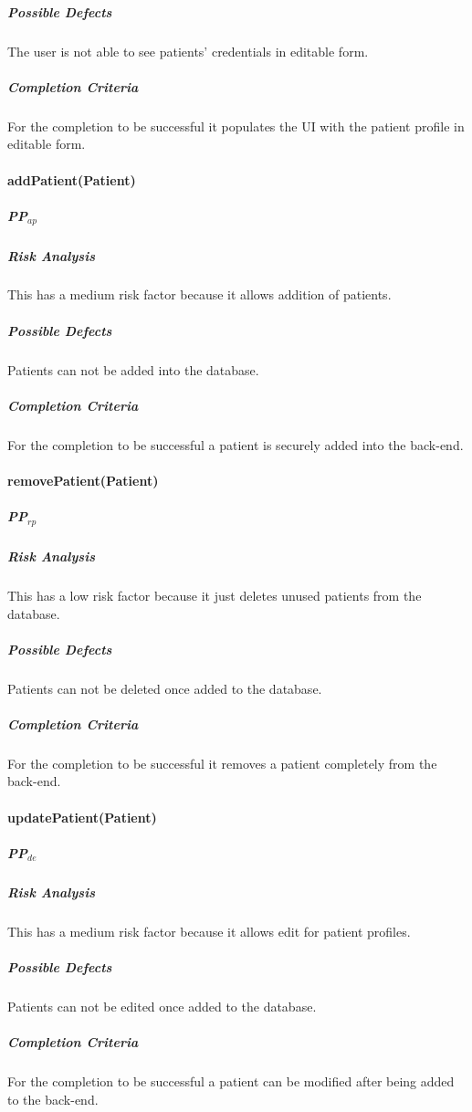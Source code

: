\documentclass{article}
\begin{document}
\subparagraph{Possible Defects}
The user is not able to see patients' credentials in editable form.

\subparagraph{Completion Criteria}
For the completion to be successful it populates the UI with the patient profile in editable form.

\paragraph{addPatient(Patient)}

\subparagraph{PP$_{ap}$}

\subparagraph{Risk Analysis}
This has a medium risk factor because it allows addition of patients.

\subparagraph{Possible Defects}
Patients can not be added into the database.

\subparagraph{Completion Criteria}
For the completion to be successful a patient is securely added into the back-end.

\paragraph{removePatient(Patient)}

\subparagraph{PP$_{rp}$}

\subparagraph{Risk Analysis}
This has a low risk factor because it just deletes unused patients from the database.

\subparagraph{Possible Defects}
Patients can not be deleted once added to the database.

\subparagraph{Completion Criteria}
For the completion to be successful it removes a patient completely from the back-end.

\paragraph{updatePatient(Patient)}

\subparagraph{PP$_{de}$}

\subparagraph{Risk Analysis}
This has a medium risk factor because it allows edit for patient profiles.

\subparagraph{Possible Defects}
Patients can not be edited once added to the database.

\subparagraph{Completion Criteria}
For the completion to be successful a patient can be modified after being added to the back-end.
\end{document}
